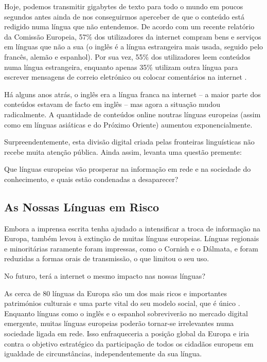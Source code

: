 \begin{multicols}{2}

Hoje, podemos transmitir gigabytes de texto para todo o mundo em poucos segundos antes ainda de nos conseguirmos aperceber de que o conteúdo está redigido numa língua que não entendemos. 
De acordo com um recente relatório da Comissão Europeia, 57\% dos utilizadores da internet compram bens e serviços em línguas que não a sua (o inglês é a língua estrangeira mais usada, seguido pelo francês, alemão e espanhol). Por sua vez, 55\% dos utilizadores leem conteúdos numa língua estrangeira, enquanto apenas 35\% utilizam outra língua para escrever mensagens de correio eletrónico ou colocar comentários na internet \cite{EC1}. 

Há alguns anos atrás, o inglês era a língua franca na internet -- a maior parte dos conteúdos estavam de facto em inglês -- mas agora a si\-tua\-ção mudou radicalmente. A quantidade de conteúdos online noutras línguas europeias (assim como em línguas asiáticas e do Próximo Oriente) aumentou exponencialmente.

Surpreendentemente, esta divisão di\-gi\-tal criada pelas fronteiras linguísticas não recebe muita atenção pública. Ainda assim, levanta uma questão premente: 

Que línguas europeias vão prosperar na informação em rede e na sociedade do co\-nhe\-ci\-men\-to, e quais estão condenadas a desaparecer?

\subsection{As Nossas Línguas em Risco}

 Embora a imprensa escrita tenha ajudado a intensificar a troca de informação na Europa, também levou à extinção de muitas línguas europeias. Línguas regionais e minoritárias raramente foram impressas, como o Cornish e o Dálmata, e foram reduzidas a formas orais de transmissão, o que limitou o seu uso. 

No futuro, terá a internet o mesmo impacto nas nossas línguas?

As cerca de 80 línguas da Europa são um dos mais ricos e importantes patrimónios culturais e uma parte vital do seu modelo social, que é único \cite{EC2}. Enquanto línguas como o inglês e o espanhol sobreviverão no mercado di\-gi\-tal emergente, muitas línguas europeias poderão tornar-se irrelevantes numa sociedade ligada em rede. Isso enfraqueceria a posição global da Europa e iria contra o objetivo estratégico da participação de todos os cidadãos europeus em igualdade de circunstâncias, independentemente da sua língua. 


\end{multicols}
